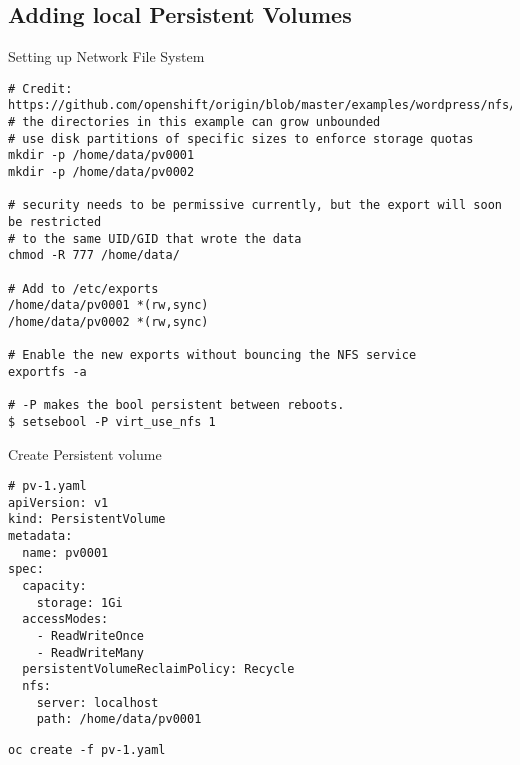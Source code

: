 \documentclass{article}
\begin{document}
\subsection{Adding local Persistent Volumes}

Setting up Network File System
\begin{lstlisting}
# Credit: https://github.com/openshift/origin/blob/master/examples/wordpress/nfs/README.md
# the directories in this example can grow unbounded
# use disk partitions of specific sizes to enforce storage quotas
mkdir -p /home/data/pv0001
mkdir -p /home/data/pv0002

# security needs to be permissive currently, but the export will soon be restricted 
# to the same UID/GID that wrote the data
chmod -R 777 /home/data/

# Add to /etc/exports
/home/data/pv0001 *(rw,sync)
/home/data/pv0002 *(rw,sync)

# Enable the new exports without bouncing the NFS service
exportfs -a

# -P makes the bool persistent between reboots.
$ setsebool -P virt_use_nfs 1
\end{lstlisting}

Create Persistent volume
\begin{lstlisting}
# pv-1.yaml
apiVersion: v1
kind: PersistentVolume
metadata:
  name: pv0001
spec:
  capacity:
    storage: 1Gi
  accessModes:
    - ReadWriteOnce
    - ReadWriteMany
  persistentVolumeReclaimPolicy: Recycle
  nfs:
    server: localhost
    path: /home/data/pv0001
\end{lstlisting}

\begin{lstlisting}
oc create -f pv-1.yaml
\end{lstlisting}
\end{document}
